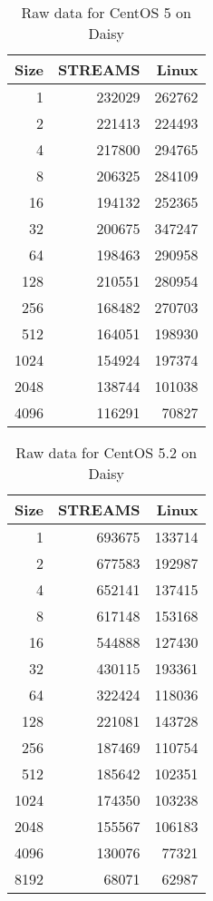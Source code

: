 \documentclass[letterpaper,final,notitlepage,twocolumn,10pt,twoside]{article}
\let\normalsize = \small
\let\small = \footnotesize
\let\footnotesize = \scriptsize
\let\scriptsize = \tiny
\begin{document}
\begin{appendix}
\begin{table}[hp]
\footnotesize
\setlength{\tabcolsep}{0.3em}
\setlength{\arraycolsep}{0.3em}
\begin{center}
\begin{tabular}{rrr}\\
\hline
Size & STREAMS & Linux\\
\hline
\hline
1 & 232029 & 262762\\
2 & 221413 & 224493\\
4 & 217800 & 294765\\
8 & 206325 & 284109\\
16 & 194132 & 252365\\
32 & 200675 & 347247\\
64 & 198463 & 290958\\
128 & 210551 & 280954\\
256 & 168482 & 270703\\
512 & 164051 & 198930\\
1024 & 154924 & 197374\\
2048 & 138744 & 101038\\
4096 & 116291 & 70827\\
\hline
\end{tabular}
\end{center}
\caption{Raw data for CentOS 5 on Daisy}
\label{table:cos5data}
\normalsize
\end{table}

\begin{table}[hp]
\footnotesize
\setlength{\tabcolsep}{0.3em}
\setlength{\arraycolsep}{0.3em}
\begin{center}
\begin{tabular}{rrr}\\
\hline
Size & STREAMS & Linux\\
\hline
\hline
1 & 693675 & 133714\\
2 & 677583 & 192987\\
4 & 652141 & 137415\\
8 & 617148 & 153168\\
16 & 544888 & 127430\\
32 & 430115 & 193361\\
64 & 322424 & 118036\\
128 & 221081 & 143728\\
256 & 187469 & 110754\\
512 & 185642 & 102351\\
1024 & 174350 & 103238\\
2048 & 155567 & 106183\\
4096 & 130076 & 77321\\
8192 & 68071 & 62987\\
\hline
\end{tabular}
\end{center}
\caption{Raw data for CentOS 5.2 on Daisy}
\label{table:cos52data}
\normalsize
\end{table}


\end{appendix}
\end{document}
